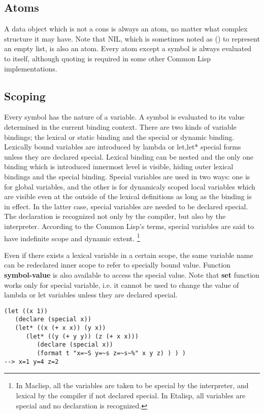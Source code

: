 \subsection{Atoms}

A data object which is not a cons is always an atom, no matter what complex
structure it may have.
Note that NIL, which is sometimes noted as () to represent an empty
list, is also an atom.
Every atom except a symbol is always evaluated to itself,
although quoting is required in some other Common Lisp implementations.

\subsection{Scoping}

Every symbol has the nature of a variable.
A symbol is evaluated to its value determined in the current binding context.
There are two kinds of variable bindings;
the lexical or static binding and the special or dynamic binding.
Lexically bound variables are introduced by lambda or let,let* special forms
unless they are declared special.
Lexical binding can be nested and the only one binding which is introduced
innermost level is visible, hiding outer lexical bindings and the special 
binding.
Special variables are used in two ways:
one is for global variables, and the other is for dynamicaly scoped
local variables which are visible even at the outside of
the lexical definitions as long as the binding is in effect.
In the latter case, special variables are needed to be declared special.
The declaration is recognized not only by the compiler, but also by
the interpreter.
According to the Common Lisp's terms, special variables are said to have
indefinite scope and dynamic extent.
\footnote{In Maclisp, all the variables are taken to be special by the
interpreter, and lexical by the compiler if not declared special.
In Etalisp, all variables are special and no declaration is recognized.}

Even if there exists a lexical variable in a certain scope,
the same variable name can be redeclared inner scope
to refer to specially bound value.
Function {\bf symbol-value} is also available to access the special value.
Note that {\bf set} function works only for special variable, i.e.
it cannot be used to change the value of lambda or let variables
unless they are declared special.

\begin{verbatim}
(let ((x 1))
   (declare (special x))
   (let* ((x (+ x x)) (y x))
      (let* ((y (+ y y)) (z (+ x x)))
         (declare (special x))
         (format t "x=~S y=~s z=~s~%" x y z) ) ) )
--> x=1 y=4 z=2
\end{verbatim}

